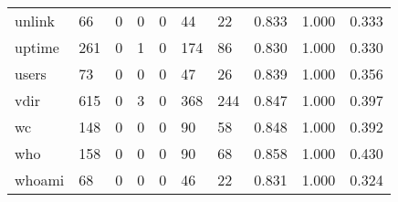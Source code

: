 \begin{longtable}{lp{1.3cm}p{1.3cm}p{1.3cm}p{1.3cm}p{1.3cm}p{1.3cm}p{1.3cm}p{1.3cm}p{1.3cm}}
unlink    &                     66 &                                             0 &                                            0 &                                           0 &                                           44 &                                         22 &                                0.833 &                                  1.000 &                                0.333 \\
uptime    &                    261 &                                             0 &                                            1 &                                           0 &                                          174 &                                         86 &                                0.830 &                                  1.000 &                                0.330 \\
users     &                     73 &                                             0 &                                            0 &                                           0 &                                           47 &                                         26 &                                0.839 &                                  1.000 &                                0.356 \\
vdir      &                    615 &                                             0 &                                            3 &                                           0 &                                          368 &                                        244 &                                0.847 &                                  1.000 &                                0.397 \\
wc        &                    148 &                                             0 &                                            0 &                                           0 &                                           90 &                                         58 &                                0.848 &                                  1.000 &                                0.392 \\
who       &                    158 &                                             0 &                                            0 &                                           0 &                                           90 &                                         68 &                                0.858 &                                  1.000 &                                0.430 \\
whoami    &                     68 &                                             0 &                                            0 &                                           0 &                                           46 &                                         22 &                                0.831 &                                  1.000 &                                0.324 \\

\end{longtable}
